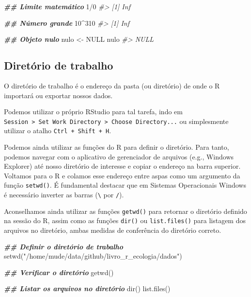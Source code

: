 \documentclass[
]{book}
\newenvironment{Shaded}{\begin{snugshade}}{\end{snugshade}}
\newcommand{\CommentTok}[1]{\textcolor[rgb]{0.37,0.37,0.37}{\textit{#1}}}
\newcommand{\ConstantTok}[1]{\textcolor[rgb]{0,0,0}{#1}}
\newcommand{\DecValTok}[1]{\textcolor[rgb]{0.06,0.06,0.06}{#1}}
\newcommand{\DocumentationTok}[1]{\textcolor[rgb]{0.37,0.37,0.37}{\textbf{\textit{#1}}}}
\newcommand{\FunctionTok}[1]{\textcolor[rgb]{0,0,0}{#1}}
\newcommand{\NormalTok}[1]{#1}
\newcommand{\OtherTok}[1]{\textcolor[rgb]{0.37,0.37,0.37}{#1}}
\newcommand{\SpecialCharTok}[1]{\textcolor[rgb]{0,0,0}{#1}}
\newcommand{\StringTok}[1]{\textcolor[rgb]{0.5,0.5,0.5}{#1}}
\begin{document}
\begin{Shaded}
\begin{Highlighting}[]
\DocumentationTok{\#\# Limite matemático}
\DecValTok{1}\SpecialCharTok{/}\DecValTok{0}
\CommentTok{\#\textgreater{} [1] Inf}

\DocumentationTok{\#\# Número grande}
\DecValTok{10}\SpecialCharTok{\^{}}\DecValTok{310}
\CommentTok{\#\textgreater{} [1] Inf}

\DocumentationTok{\#\# Objeto nulo}
\NormalTok{nulo }\OtherTok{\textless{}{-}} \ConstantTok{NULL}
\NormalTok{nulo}
\CommentTok{\#\textgreater{} NULL}
\end{Highlighting}
\end{Shaded}

\hypertarget{diretuxf3rio-de-trabalho}{%
\subsection{Diretório de trabalho}\label{diretuxf3rio-de-trabalho}}

O diretório de trabalho é o endereço da pasta (ou diretório) de onde o R importará ou exportar nossos dados.

Podemos utilizar o próprio RStudio para tal tarefa, indo em \texttt{Session\ \textgreater{}\ Set\ Work\ Directory\ \textgreater{}\ Choose\ Directory...} ou simplesmente utilizar o atalho \texttt{Ctrl\ +\ Shift\ +\ H}.

Podemos ainda utilizar as funções do R para definir o diretório. Para tanto, podemos navegar com o aplicativo de gerenciador de arquivos (e.g., Windows Explorer) até nosso diretório de interesse e copiar o endereço na barra superior. Voltamos para o R e colamos esse endereço entre aspas como um argumento da função \texttt{setwd()}. É fundamental destacar que em Sistemas Operacionais Windows é necessário inverter as barras (\texttt{\textbackslash{}} por \texttt{/}).

Aconselhamos ainda utilizar as funções \texttt{getwd()} para retornar o diretório definido na sessão do R, assim como as funções \texttt{dir()} ou \texttt{list.files()} para listagem dos arquivos no diretório, ambas medidas de conferência do diretório correto.

\begin{Shaded}
\begin{Highlighting}[]
\DocumentationTok{\#\# Definir o diretório de trabalho}
\FunctionTok{setwd}\NormalTok{(}\StringTok{"/home/mude/data/github/livro\_r\_ecologia/dados"}\NormalTok{)}

\DocumentationTok{\#\# Verificar o diretório}
\FunctionTok{getwd}\NormalTok{()}

\DocumentationTok{\#\# Listar os arquivos no diretório}
\FunctionTok{dir}\NormalTok{()}
\FunctionTok{list.files}\NormalTok{()}
\end{Highlighting}
\end{Shaded}
\end{document}
